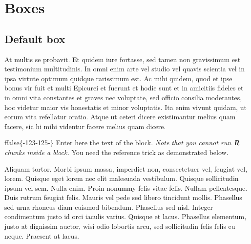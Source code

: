 \documentclass[twoside]{extreport}
\begin{document}
\hypertarget{boxes}{%
\chapter{Boxes}\label{boxes}}

\hypertarget{default-box}{%
\section{Default box}\label{default-box}}

At multis se probavit. Et quidem iure fortasse, sed tamen non
gravissimum est testimonium multitudinis. In omni enim arte vel studio
vel quavis scientia vel in ipsa virtute optimum quidque rarissimum est.
Ac mihi quidem, quod et ipse bonus vir fuit et multi Epicurei et fuerunt
et hodie sunt et in amicitiis fideles et in omni vita constantes et
graves nec voluptate, sed officio consilia moderantes, hoc videtur maior
vis honestatis et minor voluptatis. Ita enim vivunt quidam, ut eorum
vita refellatur oratio. Atque ut ceteri dicere existimantur melius quam
facere, sic hi mihi videntur facere melius quam dicere.











\begin{block}{}
ffalse\{-123-125-\}\fi{} Enter here the text of the block. \emph{Note
that you cannot run \textbf{R} chunks inside a block.} You need the
reference trick as demonstrated below.

Aliquam tortor. Morbi ipsum massa, imperdiet non,
consectetuer vel, feugiat vel, lorem. Quisque eget lorem nec elit
malesuada vestibulum. Quisque sollicitudin ipsum vel sem. Nulla enim.
Proin nonummy felis vitae felis. Nullam pellentesque. Duis rutrum
feugiat felis. Mauris vel pede sed libero tincidunt mollis. Phasellus
sed urna rhoncus diam euismod bibendum. Phasellus sed nisl. Integer
condimentum justo id orci iaculis varius. Quisque et lacus. Phasellus
elementum, justo at dignissim auctor, wisi odio lobortis arcu, sed
sollicitudin felis felis eu neque. Praesent at lacus.
\end{block}
\end{document}
